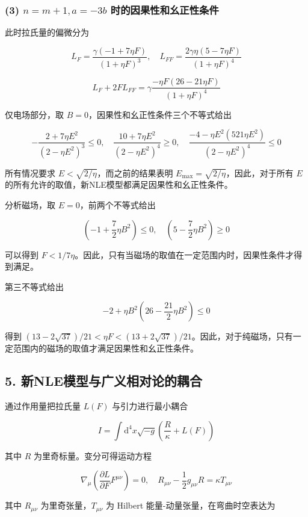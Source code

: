 \documentclass[aps,prl,preprint,groupedaddress]{revtex4-2}
\begin{document}
\subsubsection{(3) $n=m+1,a=-3b $ 时的因果性和幺正性条件}

此时拉氏量的偏微分为

$$
L_F
=\frac{\gamma\left(-1+7\eta F \right) }{\left(1+\eta F \right)^3 },\quad
L_{FF}
=\frac{2\gamma \eta\left(5-7\eta F \right) }{\left(1+\eta F \right)^4 } 
$$

$$
L_F + 2FL_{FF} 
=\gamma \frac{-\eta F\left(26-21\eta F \right) }{\left(1+\eta F \right)^4 }
$$

仅电场部分，取 $B=0 $，因果性和幺正性条件三个不等式给出
    
$$
-\frac{2+7\eta E^2 }{\left(2-\eta E^2 \right)^3 } \leq 0,\quad
\frac{10+7\eta E^2 }{\left(2-\eta E^2 \right)^4 } \geq 0,\quad
\frac{-4-\eta E^2\left(521\eta E^2 \right) }{\left(2-\eta E^2 \right)^4 } \leq 0
$$

所有情况要求 $E<\sqrt{2/\eta} $，而之前的结果表明 $E_{\max}=\sqrt{2/\eta} $，因此，对于所有 $E$ 的所有允许的取值，新NLE模型都满足因果性和幺正性条件。

分析磁场，取 $E=0 $，前两个不等式给出

$$
\left(-1+\frac{7 }{2 } \eta B^2 \right)\leq 0,\quad
\left(5-\frac{7 }{2 } \eta B^2 \right)\geq 0
$$

可以得到 $F<1/7\eta $。因此，只有当磁场的取值在一定范围内时，因果性条件才得到满足。

第三不等式给出

$$
-2+\eta B^2\left(26-\frac{21 }{2 } \eta B^2 \right)\leq 0
$$

得到 $(13-2\sqrt{37})/21<\eta F<(13+2\sqrt{37})/21 $。因此，对于纯磁场，只有一定范围内的磁场的取值才满足因果性和幺正性条件。

\subsection{5. 新NLE模型与广义相对论的耦合}

通过作用量把拉氏量 $L(F) $ 与引力进行最小耦合

$$
I
=\int \mathrm{d}^4 x\sqrt{-g}\left(\frac{R }{\kappa } + L(F) \right) 
$$

其中 $R $ 为里奇标量。变分可得运动方程

$$
\nabla_\mu\left(\frac{\partial L }{\partial F } F^{\mu\nu} \right)
=0,\quad
R_{\mu\nu} - \frac{1 }{2 } g_{\mu\nu} R
=\kappa T_{\mu\nu}
$$

其中 $R_{\mu\nu} $ 为里奇张量，$T_{\mu\nu} $ 为 Hilbert 能量-动量张量，在弯曲时空表达为
\end{document}
